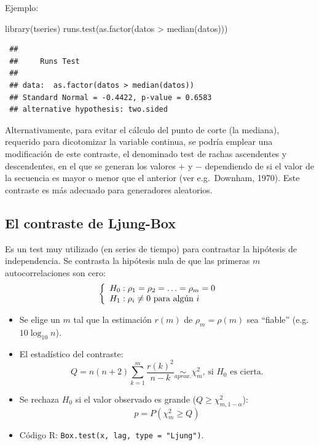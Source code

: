 \documentclass[
]{book}
\newenvironment{Shaded}{\begin{snugshade}}{\end{snugshade}}
\newcommand{\FunctionTok}[1]{\textcolor[rgb]{0.00,0.00,0.00}{#1}}
\newcommand{\NormalTok}[1]{#1}
\newcommand{\SpecialCharTok}[1]{\textcolor[rgb]{0.00,0.00,0.00}{#1}}
\theoremstyle{break}
\theoremstyle{nonumberplain}
\begin{document}
Ejemplo:

\begin{Shaded}
\begin{Highlighting}[]
\FunctionTok{library}\NormalTok{(tseries)}
\FunctionTok{runs.test}\NormalTok{(}\FunctionTok{as.factor}\NormalTok{(datos }\SpecialCharTok{\textgreater{}} \FunctionTok{median}\NormalTok{(datos)))}
\end{Highlighting}
\end{Shaded}

\begin{verbatim}
 ## 
 ##     Runs Test
 ## 
 ## data:  as.factor(datos > median(datos))
 ## Standard Normal = -0.4422, p-value = 0.6583
 ## alternative hypothesis: two.sided
\end{verbatim}

Alternativamente, para evitar el cálculo del punto de corte (la mediana), requerido para dicotomizar la variable continua, se podría emplear una modificación de este contraste, el denominado test de rachas ascendentes y descendentes, en el que se generan los valores \(+\) y \(-\) dependiendo de si el valor de la secuencia es mayor o menor que el anterior (ver e.g.~Downham, 1970). Este contraste es más adecuado para generadores aleatorios.

\hypertarget{el-contraste-de-ljung-box}{%
\subsection{El contraste de Ljung-Box}\label{el-contraste-de-ljung-box}}

Es un test muy utilizado (en series de tiempo) para contrastar la
hipótesis de independencia.
Se contrasta la hipótesis nula de que las primeras \(m\)
autocorrelaciones son cero:
\[\left\{\begin{array}[c]{l}
    H_{0}:\rho_{1}=\rho_{2}=\ldots=\rho_{m}=0\\
    H_{1}:\rho_{i}\neq0\text{ para algún } i
\end{array}
\right.\]

\begin{itemize}
\item
  Se elige un \(m\) tal que la estimación \(r(m)\) de
  \(\rho_{m}=\rho(m)\) sea ``fiable'' (e.g.~\(10\log_{10}n\)).
\item
  El estadístico del contraste:
  \[Q=n(n+2)\sum_{k=1}^{m}\frac{r(k)^{2}}{n-k}\underset{aprox.}{\sim}\chi
  _{m}^{2}\text{, si }H_{0}\text{ es cierta.}\]
\item
  Se rechaza \(H_{0}\) si el valor observado es grande (\(Q\geq \chi_{m,1-\alpha}^{2}\)):
  \[p=P\left(  {\chi_{m}^{2}}\geq Q\right)\]
\item
  Código R: \texttt{Box.test(x,\ lag,\ type\ =\ "Ljung")}.
\end{itemize}
\end{document}
